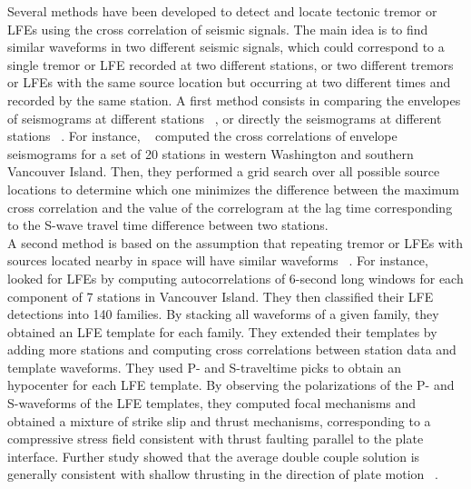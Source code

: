 \documentclass[draft]{agujournal2019}
\begin{document}
Several methods have been developed to detect and locate tectonic tremor or LFEs using the cross correlation of seismic signals. The main idea is to find similar waveforms in two different seismic signals, which could correspond to a single tremor or LFE recorded at two different stations, or two different tremors or LFEs with the same source location but occurring at two different times and recorded by the same station. A first method consists in comparing the envelopes of seismograms at different stations ~\cite{OBA_2002, WEC_2008}, or directly the seismograms at different stations ~\cite{RUB_2013}. For instance, ~ computed the cross correlations of envelope seismograms for a set of 20 stations in western Washington and southern Vancouver Island. Then, they performed a grid search over all possible source locations to determine which one minimizes the difference between the maximum cross correlation and the value of the correlogram at the lag time corresponding to the S-wave travel time difference between two stations. \\

A second method is based on the assumption that repeating tremor or LFEs with sources located nearby in space will have similar waveforms ~\cite{BOS_2012, ROY_2014, SHE_2006, SHE_2007_nature}. For instance, ~ looked for LFEs by computing autocorrelations of 6-second long windows for each component of 7 stations in Vancouver Island. They then classified their LFE detections into 140 families. By stacking all waveforms of a given family, they obtained an LFE template for each family. They extended their templates by adding more stations and computing cross correlations between station data and template waveforms. They used P- and S-traveltime picks to obtain an hypocenter for each LFE template. By observing the polarizations of the P- and S-waveforms of the LFE templates, they computed focal mechanisms and obtained a mixture of strike slip and thrust mechanisms, corresponding to a compressive stress field consistent with thrust faulting parallel to the plate interface. Further study showed that the average double couple solution is generally consistent with shallow thrusting in the direction of plate motion ~\cite{ROY_2014}. \\
\end{document}
